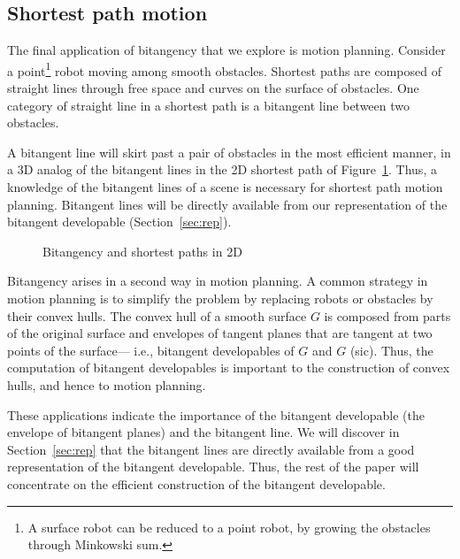 \documentclass[12pt]{article}
\newif\ifJournal
\begin{document}
\ifJournal
\begin{figure}[b]
\vspace{1in}
\caption{Bitangency and lighting}
\label{fig:lighting}
\end{figure}
\fi


\subsection{Shortest path motion}

The final application of bitangency that we explore
is motion planning.
Consider a point\footnote{A
	surface robot can be reduced to a point robot, 
	by growing the obstacles through Minkowski sum.}
robot moving among smooth obstacles.
Shortest paths are composed of straight lines through free space and
curves on the surface of obstacles.
One category of straight line in a shortest path
is a bitangent line between two obstacles.

A bitangent line will skirt past a pair of obstacles in the most efficient
manner, in a 3D analog of the bitangent lines in the 2D shortest path of
Figure~\ref{fig:motion}.
Thus, a knowledge of the bitangent lines of a scene is necessary
for shortest path motion planning.
Bitangent lines will be directly available from our representation
of the bitangent developable (Section~\ref{sec:rep}).

\begin{figure}[b]
\caption{Bitangency and shortest paths in 2D}
\label{fig:motion}
\end{figure}

Bitangency arises in a second way in motion planning.
A common strategy in motion planning is to simplify the problem by replacing
robots or obstacles by their convex hulls.
The convex hull of a smooth surface $G$ is composed from parts of
the original surface and envelopes
of tangent planes that are tangent at two points of the surface---
i.e., bitangent developables of $G$ and $G$ (sic).
Thus, the computation of bitangent developables is important
to the construction of convex hulls, and hence to motion planning.

These applications indicate the importance of the bitangent developable
(the envelope of bitangent planes) and the bitangent line.
We will discover in Section~\ref{sec:rep} that 
the bitangent lines are directly available from a good representation 
of the bitangent developable.
Thus, the rest of the paper will concentrate on the efficient construction
of the bitangent developable.
\end{document}
